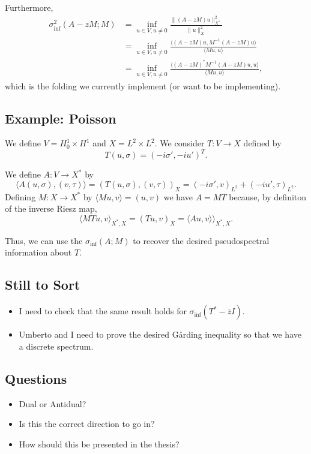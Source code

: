 \documentclass[12pt,a4paper]{article}
\begin{document}
Furthermore,
\begin{align}
    \sigma_{\inf}^2(A-zM;M) &= \inf_{u \in V, u \ne 0} \frac{\|(A-zM) u \|_{X^*}^2}{\|u\|_X^2}\\
    &= \inf_{u \in V, u \ne 0} \frac{ \langle (A-zM)u, M^{-1} (A-zM)u \rangle } {\langle Mu, u \rangle} \\
    &= \inf_{u \in V, u \ne 0} \frac{ \langle (A-zM)^* M^{-1} (A-zM) u, u \rangle} {\langle Mu, u \rangle},
\end{align}
which is the folding we currently implement (or want to be implementing). 


\subsection{Example: Poisson}

We define $V = H_0^1 \times H^1$ and $X = L^2 \times L^2.$ We consider $T:V \rightarrow X$ defined by 
\begin{equation}
    T(u, \sigma) = (-i \sigma', -i u')^T. 
\end{equation}

We define $A:V \rightarrow X^*$ by 
\begin{equation}
    \langle A(u, \sigma), (v, \tau)\rangle = (T(u, \sigma), (v, \tau))_{X} = (-i \sigma', v)_{L^2} + (-iu', \tau)_{L^2}.
\end{equation}
Defining $M:X \rightarrow X^*$  by $\langle Mu, v \rangle = (u, v)$ we have $A = MT$ because, by definiton of the inverse Riesz map,
\begin{equation}
    \langle MTu, v\rangle_{X^*, X} = (Tu, v)_X = \langle Au, v \rangle\rangle_{X^*, X}. 
\end{equation}

Thus, we can use the $\sigma_{\inf}(A;M)$ to recover the desired pseudospectral information about $T.$ 


\subsection{Still to Sort}
\begin{itemize}
    \item I need to check that the same result holds for $\sigma_{\inf}(T^* - \overline{z}I).$
    \item Umberto and I need to prove the desired Gårding inequality so that we have a discrete spectrum. 
\end{itemize}
\subsection{Questions}
\begin{itemize}
    \item Dual or Antidual?
    \item Is this the correct direction to go in? 
    \item How should this be presented in the thesis? 
\end{itemize}
\end{document}
